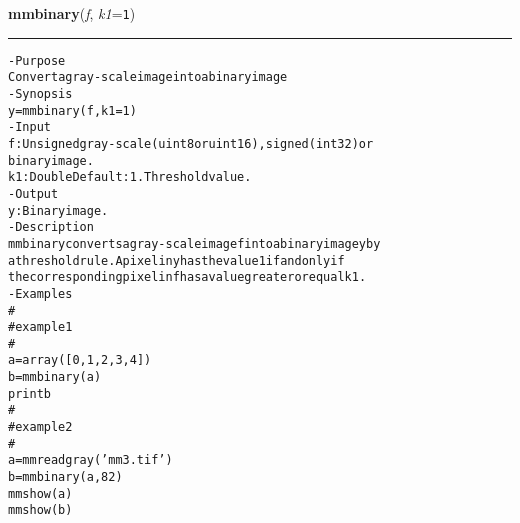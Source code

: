     \begin{boxedminipage}{\textwidth}

    \raggedright \textbf{mmbinary}(\textit{f}, \textit{k1}=\texttt{1\-})

    \vspace{-1.5ex}

    \rule{\textwidth}{0.5\fboxrule}
\begin{alltt}
- Purpose
    Convert a gray-scale image into a binary image
- Synopsis
    y = mmbinary(f, k1=1)
- Input
    f:  Unsigned gray-scale (uint8 or uint16), signed (int32) or
        binary image.
    k1: Double Default: 1. Threshold value.
- Output
    y: Binary image.
- Description
    mmbinary converts a gray-scale image f into a binary image y by
    a threshold rule. A pixel in y has the value 1 if and only if
    the corresponding pixel in f has a value greater or equal k1 .
- Examples
    \#
    \#   example 1
    \#
    a = array([0, 1, 2, 3, 4])
    b=mmbinary(a)
    print b
    \#
    \#   example 2
    \#
    a=mmreadgray('mm3.tif')
    b=mmbinary(a,82)
    mmshow(a)
    mmshow(b)\end{alltt}

    \vspace{1ex}

    \end{boxedminipage}

    \label{multireg:num_pymorph:mmblob}
    \vspace{0.5ex}

